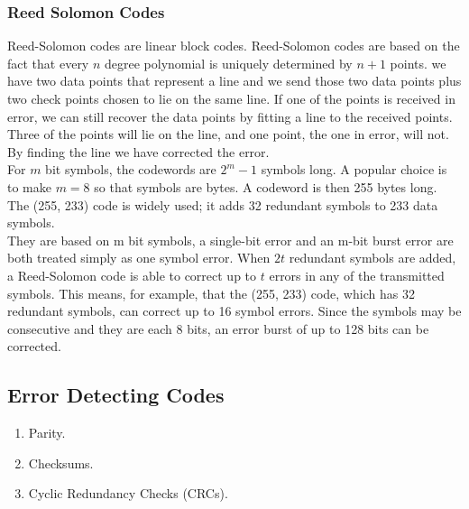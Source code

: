 \documentclass[a4paper,oneside]{book}
\begin{document}
\subsubsection{Reed Solomon Codes}
Reed-Solomon codes are linear block codes. Reed-Solomon codes are based on the fact that every $n$ degree polynomial is uniquely determined by $n + 1$ points. we have two data points that represent a line and we send those two data points plus two check points chosen to lie on the same line. If one of the points is received in error, we can still recover the data points by fitting a line to the received points. Three of the points will lie on the line, and one point, the one in error, will not. By finding the line we have corrected the error. \\
For $m$ bit symbols, the codewords are $2^m - 1$ symbols long. A popular choice is to make $m = 8$ so that symbols are bytes. A codeword is then 255 bytes long. The (255, 233) code is widely used; it adds 32 redundant symbols to 233 data symbols. \\
They are based on m bit symbols, a single-bit error and an m-bit burst error are both treated simply as one symbol error. When $2t$ redundant symbols are added, a Reed-Solomon code is able to correct up to $t$ errors in any of the transmitted symbols. This means, for example, that the (255, 233) code, which has 32 redundant symbols, can correct up to 16 symbol errors. Since the symbols may be consecutive and they are each 8 bits, an error burst of up to 128 bits can be corrected.
\subsection{Error Detecting Codes}
\begin{enumerate}
\item Parity.
\item Checksums.
\item Cyclic Redundancy Checks (CRCs).
\end{enumerate}
\end{document}
